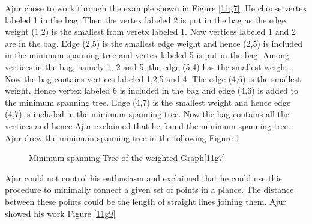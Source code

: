 Ajur chose to work through the example shown in Figure \ref{11g7}. He choose vertex labeled 1 in the bag. Then the vertex labeled 2 is put in the bag as the edge weight (1,2) is the smallest from veretx labeled 1. Now vertices labeled 1 and 2 are in the bag. Edge (2,5) is the smallest edge weight and hence (2,5) is included in the minimum spanning tree and vertex labeled 5 is put in the bag. Among vertices in the bag, namely 1, 2 and 5, the edge (5,4) has the smallest weight. Now the bag contains vertices labeled 1,2,5 and 4. The edge (4,6) is the smallest weight. Hence vertex labeled 6 is included in the bag and edge (4,6) is added to the minimum spanning tree. Edge (4,7) is the smallest weight and hence edge (4,7) is  included in the minimum spanning tree. Now the bag contains all the vertices and hence Ajur exclaimed that he found the minimum spanning tree.
Ajur drew the minimum spanning tree in the following Figure \ref{11g8}

\begin{figure}
\begin{center}
\caption{ Minimum spanning Tree of the weighted Graph\ref{11g7}}\label{11g8}
\end{center}
\end{figure}

Ajur could not control his enthusiasm and exclaimed that he could use this procedure to minimally connect a given set of points in a plance. The distance between these points could be the length of straight lines joining them. Ajur showed his work Figure \ref{11g9}


